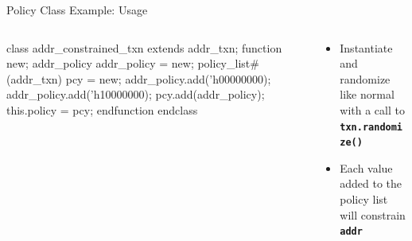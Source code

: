 \documentclass[aspectratio=169]{beamer}
\newcommand{\code}[1]{
  \textbf{\texttt{#1}}
}
\begin{document}
\begin{frame}[fragile]{Policy Class Example: Usage}
\begin{columns}
\begin{column}{0.65\textwidth}
\begin{svcode}
class addr_constrained_txn extends addr_txn;
  function new;
    addr_policy addr_policy = new;
    policy_list#(addr_txn) pcy = new;
    addr_policy.add('h00000000);
    addr_policy.add('h10000000);
    pcy.add(addr_policy);
    this.policy = {pcy};
  endfunction
endclass
\end{svcode}
\end{column}
\begin{column}{0.3\textwidth}
  \begin{itemize}
    \item Instantiate and randomize like normal with a call to \code{txn.randomize()}
    \item Each value added to the policy list will constrain \code{addr}
  \end{itemize}
\end{column}
\end{columns}
\end{frame}

\begin{frame}
\end{frame}
\end{document}
